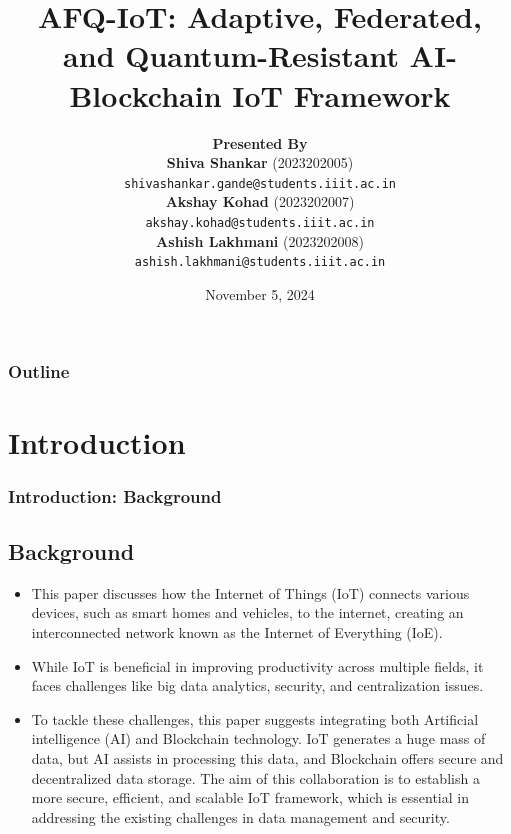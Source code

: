 \documentclass [xcolor=svgnames] {beamer}
\title[AFQ-IoT]{\textbf{AFQ-IoT: Adaptive, Federated, and Quantum-Resistant AI-Blockchain IoT Framework}}
\author[Shiva, Akshay, Ashish (IIIT-H)]{
    \textbf{Presented By}\\
    \textbf{Shiva Shankar} (2023202005) \\ \texttt{shivashankar.gande@students.iiit.ac.in} \\[0.2\baselineskip]
    \textbf{Akshay Kohad} (2023202007) \\ \texttt{akshay.kohad@students.iiit.ac.in} \\[0.2\baselineskip]
    \textbf{Ashish Lakhmani} (2023202008) \\ \texttt{ashish.lakhmani@students.iiit.ac.in}
}
\institute[]
{
    \vspace{0.5cm} %
    \large \textbf{International Institute of Information Technology, Hyderabad}
}
\date{November 5, 2024}
\begin{document}
\begin{frame}
\titlepage
\end{frame}

\begin{frame}
\frametitle{Outline}
  \tableofcontents
\end{frame}


\section{Introduction}
\begin{frame}
\small
\frametitle{Introduction: Background}
\subsection{Background}

\begin{itemize}
\item This paper discusses how the Internet of Things (IoT) connects various devices, such as smart homes and vehicles, to the internet, creating an interconnected network known as the Internet of Everything (IoE). 

\item While IoT is beneficial in improving productivity across multiple fields, it faces challenges like big data analytics, security, and centralization issues. 

\item To tackle these challenges, this paper suggests integrating both Artificial intelligence (AI) and Blockchain technology. IoT generates a huge mass of data, but AI assists in processing this data, and Blockchain offers secure and decentralized data storage. The aim of this collaboration is to establish a more secure, efficient, and scalable IoT framework, which is essential in addressing the existing challenges in data management and security.
\end{itemize}

\end{frame}
\end{document}
